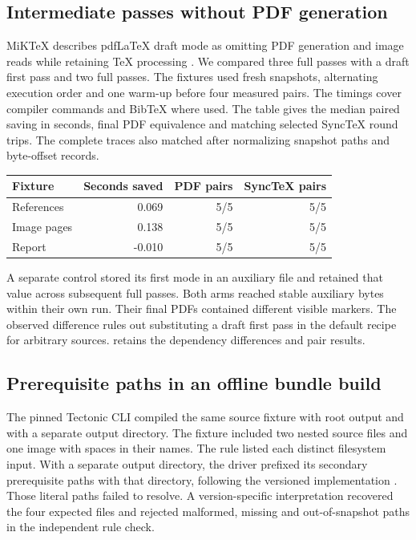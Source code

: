 \subsection{Intermediate passes without PDF generation}

MiK\TeX{} describes pdf\LaTeX{} draft mode as omitting PDF generation and
image reads while retaining TeX processing \cite{miktexpdftexdraft}.
We compared three full passes with a draft first pass and two full passes.
The fixtures used fresh snapshots, alternating execution order and one
warm-up before four measured pairs. The timings cover compiler commands
and BibTeX where used. The table gives the median paired saving in
seconds, final PDF equivalence and matching selected SyncTeX round trips.
The complete traces also matched after normalizing snapshot paths and
byte-offset records.

\begin{center}
\small
\begin{tabular}{lrrr}
\toprule
Fixture & Seconds saved & PDF pairs & SyncTeX pairs \\
\midrule
References & 0.069 & 5/5 & 5/5 \\
Image pages & 0.138 & 5/5 & 5/5 \\
Report & -0.010 & 5/5 & 5/5 \\
\bottomrule
\end{tabular}
\end{center}

A separate control stored its first mode in an auxiliary file and retained
that value across subsequent full passes. Both arms reached stable
auxiliary bytes within their own run. Their final PDFs contained different
visible markers. The observed difference rules out substituting a draft
first pass in the default recipe for arbitrary sources.
 retains the
dependency differences and pair results.

\subsection{Prerequisite paths in an offline bundle build}

The pinned Tectonic CLI compiled the same source fixture with root output
and with a separate output directory. The fixture included two nested
source files and one image with spaces in their names. The rule listed
each distinct filesystem input. With a separate output directory, the
driver prefixed its secondary prerequisite paths with that directory,
following the versioned implementation \cite{tectonicdriver}. Those
literal paths failed to resolve. A version-specific interpretation
recovered the four expected files and rejected malformed, missing and
out-of-snapshot paths in the independent rule check.

